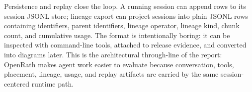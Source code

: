 Persistence and replay close the loop. A running session can append rows to its
session JSONL store; lineage export can project sessions into plain JSONL rows
containing identifiers, parent identifiers, lineage operator, lineage kind,
chunk count, and cumulative usage. The format is intentionally boring: it can be
inspected with command-line tools, attached to release evidence, and converted
into diagrams later. This is the architectural through-line of the report:
OpenRath makes agent work easier to evaluate because conversation, tools,
placement, lineage, usage, and replay artifacts are carried by the same
session-centered runtime path.
